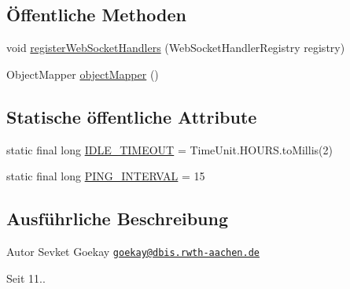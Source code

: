\subsection*{Öffentliche Methoden}
\begin{DoxyCompactItemize}
\item 
void \hyperlink{classde_1_1rwth_1_1idsg_1_1steve_1_1config_1_1_web_socket_configuration_a5b9a235259f47b986eea0f931599700b}{register\-Web\-Socket\-Handlers} (Web\-Socket\-Handler\-Registry registry)
\item 
Object\-Mapper \hyperlink{classde_1_1rwth_1_1idsg_1_1steve_1_1config_1_1_web_socket_configuration_af0f897fbe1970c78fc61e476e50e8c6d}{object\-Mapper} ()
\end{DoxyCompactItemize}
\subsection*{Statische öffentliche Attribute}
\begin{DoxyCompactItemize}
\item 
static final long \hyperlink{classde_1_1rwth_1_1idsg_1_1steve_1_1config_1_1_web_socket_configuration_a6a950c6ec954540c66dda295b8fb40b9}{I\-D\-L\-E\-\_\-\-T\-I\-M\-E\-O\-U\-T} = Time\-Unit.\-H\-O\-U\-R\-S.\-to\-Millis(2)
\item 
static final long \hyperlink{classde_1_1rwth_1_1idsg_1_1steve_1_1config_1_1_web_socket_configuration_aa11b5dc252d4aa2d65e849afe891c1d3}{P\-I\-N\-G\-\_\-\-I\-N\-T\-E\-R\-V\-A\-L} = 15
\end{DoxyCompactItemize}


\subsection{Ausführliche Beschreibung}
\begin{DoxyAuthor}{Autor}
Sevket Goekay \href{mailto:goekay@dbis.rwth-aachen.de}{\tt goekay@dbis.\-rwth-\/aachen.\-de} 
\end{DoxyAuthor}
\begin{DoxySince}{Seit}
11.. 
\end{DoxySince}


